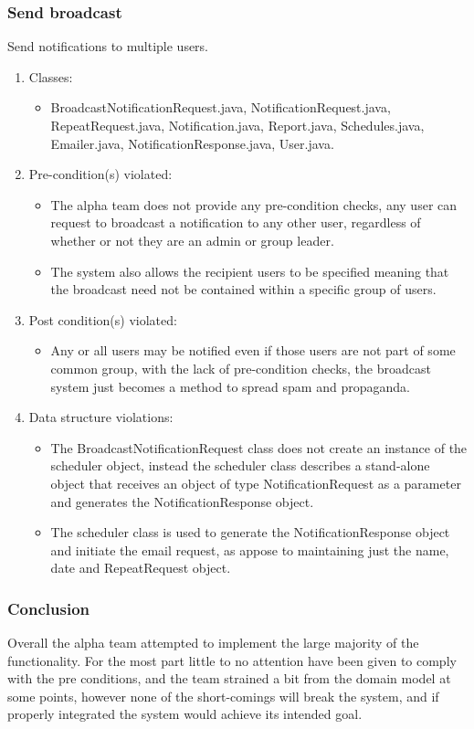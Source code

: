 \subsubsection*{Send broadcast}
Send notifications to multiple users.
	\begin{enumerate}
		\item Classes: 
			\begin{itemize}
				\item BroadcastNotificationRequest.java, NotificationRequest.java, RepeatRequest.java, Notification.java, 								Report.java, Schedules.java, Emailer.java, NotificationResponse.java, User.java.
			\end{itemize}
		\item Pre-condition(s) violated: 
			\begin{itemize}
				\item The alpha team does not provide any pre-condition checks, any user can request to broadcast a notification 						to any other user, regardless of whether or not they are an admin or group leader.
				\item The system also allows the recipient users to be specified meaning that the broadcast need not be contained 					within a specific group of users.
			\end{itemize}
		\item Post condition(s) violated: 
			\begin{itemize}
				\item Any or all users may be notified even if those users are not part of some common group, with the lack of 							pre-condition checks, the broadcast system just becomes a method to spread spam and propaganda.
			\end{itemize}
		\item Data structure violations:
			\begin{itemize}
				\item The BroadcastNotificationRequest class does not create an instance of the scheduler object, instead the 							scheduler class describes a stand-alone object that receives an object of type NotificationRequest as a 							parameter and generates the NotificationResponse object.
				\item The scheduler class is used to generate the NotificationResponse object and initiate the email request, as 						appose to maintaining just the name, date and RepeatRequest object. 
			\end{itemize}
\end{enumerate}
\newpage

\subsubsection*{Conclusion}
Overall the alpha team attempted to implement the large majority of the functionality. For the most part little to no attention 
have been given to comply with the pre conditions, and the team strained a bit from the domain model at some points, 
however none of the short-comings will break the system, and  if properly integrated the system would achieve its intended goal.
